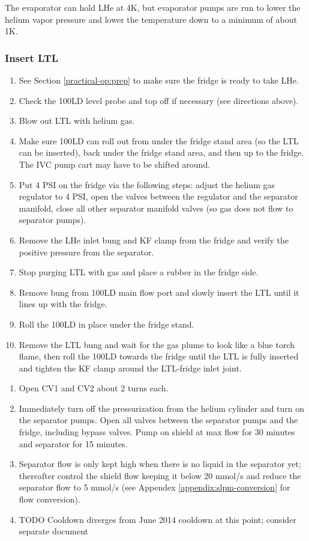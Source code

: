 The evaporator can hold LHe at 4K, but evaporator pumps are run to lower the helium vapor pressure and lower the temperature down to a minimum of about 1K.

\subsubsection{Insert LTL}
\begin{enumerate}
 \item See Section \ref{practical-op:prep} to make sure the fridge is ready to take LHe.
 \item Check the 100LD level probe and top off if necessary (see directions above).
 \item Blow out LTL with helium gas.
 \item Make sure 100LD can roll out from under the fridge stand area (so the LTL can be inserted), back under the fridge stand area, and then up to the fridge.  The IVC pump cart may have to be shifted around.
 \item Put 4 PSI on the fridge via the following steps: adjust the helium gas regulator to 4 PSI, open the valves between the regulator and the separator manifold, close all other separator manifold valves (so gas does not flow to separator pumps).
 \item Remove the LHe inlet bung and KF clamp from the fridge and verify the positive pressure from the separator.
 \item Stop purging LTL with gas and place a rubber in the fridge side.
 \item Remove bung from 100LD main flow port and slowly insert the LTL until it lines up with the fridge.
 \item Roll the 100LD in place under the fridge stand.
 \item Remove the LTL bung and wait for the gas plume to look like a blue torch flame, then roll the 100LD towards the fridge until the LTL is fully inserted and tighten the KF clamp around the LTL-fridge inlet joint.
 \end{enumerate}
 
 \begin{enumerate}
 \item Open CV1 and CV2 about 2 turns each.
 \item Immediately turn off the pressurization from the helium cylinder and turn on the separator pumps.  Open all valves between the separator pumps and the fridge, including bypass valves.  Pump on shield at max flow for 30 minutes and separator for 15 minutes\cite{tapio-cooldown-procedure}.
 \item Separator flow is only kept high when there is no liquid in the separator yet; thereafter control the shield flow keeping it below 20 mmol/s and reduce the separator flow to 5 mmol/s (see Appendex \ref{appendix:slpm-conversion} for flow conversion). 
 \item TODO Cooldown diverges from June 2014 cooldown at this point; consider separate document
\end{enumerate}


